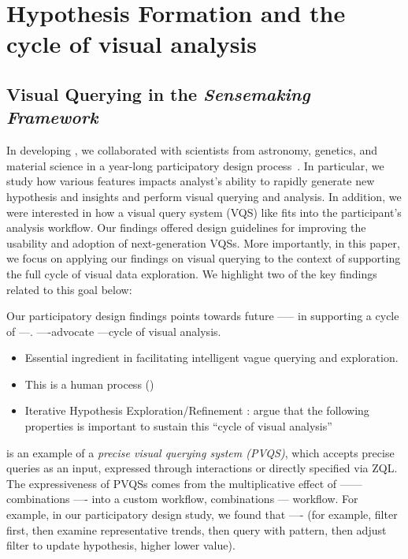 \section{Hypothesis Formation and the cycle of visual analysis\label{sec:hypothesis}}
\subsection{Visual Querying in the \textit{Sensemaking Framework}}
In developing \zv, we collaborated with scientists from astronomy, genetics, and material science in a year-long participatory design process~\cite{Lee2017}. In particular, we study how various features impacts analyst's ability to rapidly generate new hypothesis and insights and perform visual querying and analysis. In addition, we were interested in how a visual query system (VQS) like \zv fits into the participant's analysis workflow. Our findings offered design guidelines for improving the usability and adoption of next-generation VQSs. More importantly, in this paper, we focus on applying our findings on visual querying to the context of supporting the full cycle of visual data exploration. We highlight two of the key findings related to this goal below: 

Our participatory design findings points towards future ----- in supporting a cycle of ---.  ----advocate ---cycle of visual analysis. 
\begin{itemize}
	\item Essential ingredient in facilitating intelligent vague querying and exploration.
	\item This is a human process (\cite{Heer2012,Pirolli})
	\item Iterative Hypothesis Exploration/Refinement : argue that the following properties is important to sustain this “cycle of visual analysis” 
\end{itemize}


\zv is an example of a \emph{precise visual querying system (PVQS)}, which accepts precise queries as an input, expressed through interactions or directly specified via ZQL. The expressiveness of PVQSs comes from the multiplicative effect of ------ combinations ---- into a custom workflow, combinations --- workflow. For example, in our participatory design study, we found that ---- (for example, filter first, then examine representative trends, then query with pattern, then adjust filter to update hypothesis, higher lower value). 

